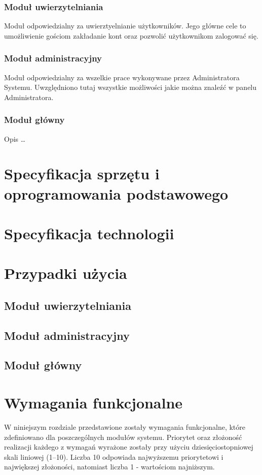 \documentclass[12pt, oneside, final]{report}
\begin{document}
\subsection{Moduł uwierzytelniania}
Moduł odpowiedzialny za uwierztyelnianie użytkowników. Jego główne cele to umożliwienie gościom zakładanie kont oraz pozwolić użytkownikom zalogować się.
\subsection{Moduł administracyjny}
Moduł odpowiedzialny za wszelkie prace wykonywane przez Administratora Systemu. Uwzględniono tutaj wszystkie możliwości jakie można znaleźć w panelu Administratora.
\subsection{Moduł główny}
Opis \ldots \todo

\chapter{Specyfikacja sprzętu i oprogramowania podstawowego}
\todo
\chapter{Specyfikacja technologii}
\todo
\chapter{Przypadki użycia}
\section{Moduł uwierzytelniania}

\section{Moduł administracyjny}

\section{Moduł główny}


\chapter{Wymagania funkcjonalne}
W niniejszym rozdziale przedstawione zostały wymagania funkcjonalne, które zdefiniowano dla poszczególnych modułów systemu. Priorytet oraz złożoność realizacji każdego z wymagań wyrażone zostały przy użyciu dziesięciostopniowej skali liniowej (1--10). Liczba 10 odpowiada najwyższemu priorytetowi i największej złożoności, natomiast liczba 1 - wartościom najniższym.
\end{document}

